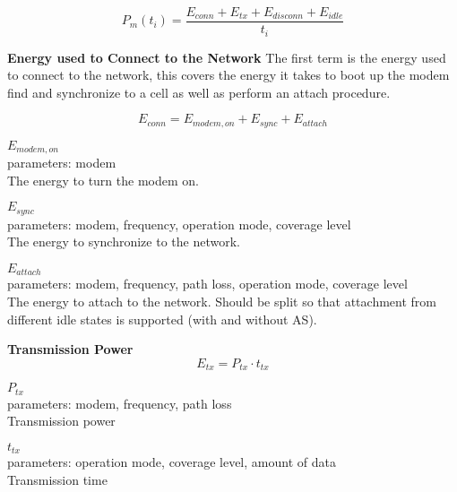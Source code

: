 \begin{equation}
P_m(t_i) = \frac{E_{conn} + E_{tx} + E_{disconn} + E_{idle}}{t_i}
\end{equation}
\begin{where}
\end{where}


\textbf{Energy used to Connect to the Network}
The first term is the energy used to connect to the network, this covers the energy it takes to boot up the modem find and synchronize to a cell as well as perform an attach procedure. 

\begin{equation}
E_{conn} = E_{modem,on} + E_{sync} + E_{attach}
\end{equation}

$E_{modem,on}$\\
parameters: modem\\
The energy to turn the modem on.

$E_{sync}$\\
parameters: modem, frequency, operation mode, coverage level\\
The energy to synchronize to the network.

$E_{attach}$\\
parameters: modem, frequency, path loss, operation mode, coverage level\\
The energy to attach to the network. Should be split so that attachment from different idle states is supported (with and without AS).

\textbf{Transmission Power}
\begin{equation}
E_{tx} = P_{tx}\cdot t_{tx}
\end{equation}

$P_{tx}$\\
parameters: modem, frequency, path loss\\
Transmission power

$t_{tx}$\\
parameters: operation mode, coverage level, amount of data\\
Transmission time

